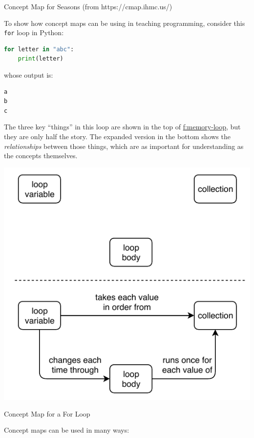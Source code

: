 Concept Map for Seasons (from https://cmap.ihmc.us/)

To show how concept maps can be using in teaching programming, consider
this \texttt{for} loop in Python:

\begin{lstlisting}[language=python]
for letter in "abc":
    print(letter)
\end{lstlisting}

whose output is:

\begin{lstlisting}[backgroundcolor=\color{verylightgray}]
a
b
c
\end{lstlisting}

The three key ``things'' in this loop are shown in the top of
\protect\hyperlink{FIGURE}{f:memory-loop}, but they are only half the story. The
expanded version in the bottom shows the \emph{relationships} between those
things, which are as important for understanding as the concepts
themselves.

\includegraphics{../../files/for-loop.pdf}

Concept Map for a For Loop

Concept maps can be used in many ways:

